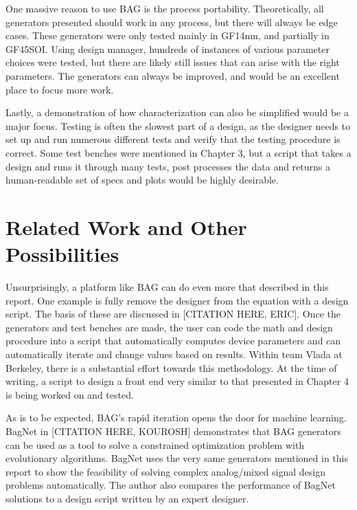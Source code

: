One massive reason to use BAG is the process portability. Theoretically, all generators presented should work in any process, but there will always be edge cases. These generators were only tested mainly in GF14nm, and partially in GF45SOI. Using design manager, hundreds of instances of various parameter choices were tested, but there are likely still issues that can arise with the right parameters. The generators can always be improved, and would be an excellent place to focus more work.

Lastly, a demonstration of how characterization can also be simplified would be a major focus. Testing is often the slowest part of a design, as the designer needs to set up and run numerous different tests and verify that the testing procedure is correct. Some test benches were mentioned in Chapter 3, but a script that takes a design and runs it through many tests, post processes the data and returns a human-readable set of specs and plots would be highly desirable. 
\section{Related Work and Other Possibilities}
Unsurprisingly, a platform like BAG can do even more that described in this report. One example is fully remove the designer from the equation with a design script. The basis of these are discussed in [CITATION HERE, ERIC]. Once the generators and test benches are made, the user can code the math and design procedure into a script that automatically computes device parameters and can automatically iterate and change values based on results. Within team Vlada at Berkeley, there is a substantial effort towards this methodology. At the time of writing, a script to design a front end very similar to that presented in Chapter 4 is being worked on and tested.

As is to be expected, BAG's rapid iteration opens the door for machine learning. BagNet in [CITATION HERE, KOUROSH] demonstrates that BAG generators can be used as a tool to solve a constrained optimization problem with evolutionary algorithms. BagNet uses the very same generators mentioned in this report to show the feasibility of solving complex analog/mixed signal design problems automatically. The author also compares the performance of BagNet solutions to a design script written by an expert designer.